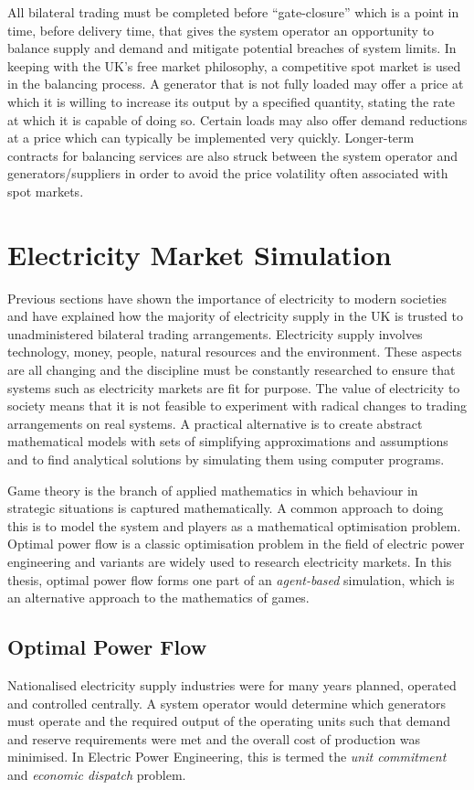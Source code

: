 All bilateral trading must be completed before ``gate-closure'' which is a
point in time, before delivery time, that gives the system operator an
opportunity to balance supply and demand and mitigate potential breaches of
system limits.  In keeping with the UK's free market philosophy, a competitive
spot market \cite{schweppe:spot} is used in the balancing process.  A
generator that is not fully loaded may offer a price at which it is willing to
increase its output by a specified quantity, stating the rate at which it is
capable of doing so.  Certain loads may also offer demand reductions at a
price which can typically be implemented very quickly.  Longer-term contracts
for balancing services are also struck between the system operator and
generators/suppliers in order to avoid the price volatility often associated
with spot markets.

\section{Electricity Market Simulation}
Previous sections have shown the importance of electricity to
modern societies and have explained how the majority of
electricity supply in the UK is trusted to unadministered bilateral trading
arrangements. Electricity supply involves technology, money, people, natural resources and the environment.  These aspects are all changing
and the discipline must be constantly researched to ensure that systems such as
electricity markets are fit for purpose.  The value of electricity to society
means that it is not feasible to experiment with radical changes to trading
arrangements on real systems.  A practical alternative is to create abstract
mathematical models with sets of simplifying approximations and assumptions
and to find analytical solutions by simulating them using computer programs.

Game theory is the branch of applied mathematics in which behaviour in
strategic situations is captured mathematically.  A common approach to doing
this is to model the system and players as a mathematical optimisation problem.  Optimal
power flow is a classic optimisation problem in the field of electric
power engineering and variants are widely used to research electricity
markets.  In this thesis, optimal power flow forms one part of an
\textit{agent-based} simulation, which is an alternative approach to the
mathematics of games.

\subsection{Optimal Power Flow}
\label{sec:opf}
Nationalised electricity supply industries were for many years planned,
operated and controlled centrally.  A system operator would determine which
generators must operate and the required output of the operating units such
that demand and reserve requirements were met and the overall cost of
production was minimised.  In Electric Power Engineering, this is termed the
\textit{unit commitment} and \textit{economic dispatch} problem.

